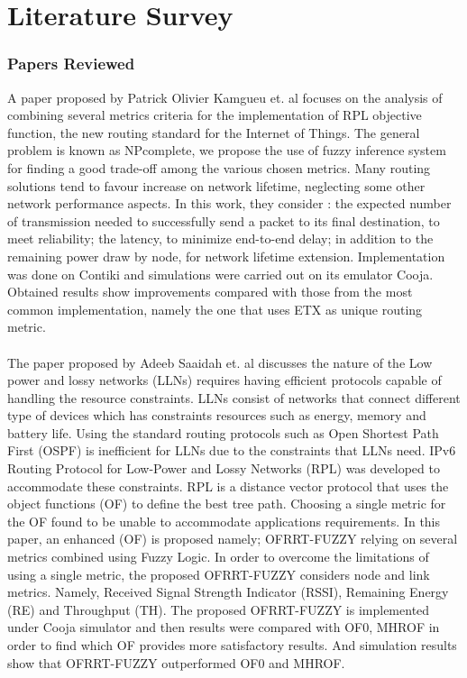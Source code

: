 \chapter{Literature Survey} \label{Literature Survey}
\subsection{Papers Reviewed} \label{Papers Reviewed}
A paper proposed by Patrick Olivier Kamgueu et. al focuses on the analysis of combining several metrics criteria for the implementation of RPL objective function, the new routing standard for the Internet of Things. The general problem is known as NPcomplete, we propose the use of fuzzy inference system for finding a good trade-off among the various chosen metrics. Many routing solutions tend to favour increase on network lifetime, neglecting some  other network performance aspects. In this work, they consider : the expected number of transmission needed to successfully send a packet to its final destination, to meet reliability; the latency, to minimize end-to-end delay; in addition to the remaining power draw by node, for network lifetime extension. Implementation was done on Contiki and simulations were carried out on its emulator Cooja. Obtained results show improvements compared with those from the most common implementation, namely the one that uses ETX as unique routing metric\cite{1}.
\\
\\
The paper proposed by Adeeb Saaidah et. al discusses the nature of the Low power and lossy networks (LLNs) requires having efficient protocols capable of handling the resource constraints. LLNs consist of networks that connect different type of devices which has constraints resources such as energy, memory and battery life. Using the standard routing protocols such as Open Shortest Path First (OSPF) is inefficient for LLNs due to the constraints that LLNs need. IPv6 Routing Protocol for Low-Power and Lossy Networks (RPL) was developed to accommodate these constraints. RPL is a distance vector protocol that uses the object functions (OF) to define the best tree path. Choosing a single metric for the OF found to be unable to accommodate applications requirements. In this paper, an enhanced (OF) is proposed namely; OFRRT-FUZZY relying on several metrics combined using Fuzzy Logic. In order to overcome the limitations of using a single metric, the proposed OFRRT-FUZZY considers node and link metrics. Namely, Received Signal Strength Indicator (RSSI), Remaining Energy (RE) and Throughput (TH). The proposed OFRRT-FUZZY is implemented under Cooja simulator and then results were compared with OF0, MHROF in order to find which OF provides more satisfactory results. And simulation results show that OFRRT-FUZZY outperformed OF0 and MHROF\cite{2}.
